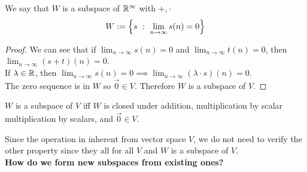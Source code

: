 We say that $W$ is a subspace of $\mathbb R^\infty$ with $+, \cdot$
\[ W := \left\{ s \ : \ \lim_{n \to \infty} s(n) = 0 \right\} \]
\begin{proof}
    We can see that if $\displaystyle \lim_{n \to \infty} s(n) = 0$ and $\displaystyle \lim_{n \to \infty} t(n) = 0$, then $\displaystyle \lim_{n \to \infty} (s + t)(n) = 0 $. \\
    If $\lambda \in \mathbb R$, then $\displaystyle \lim_{n \to \infty} s(n) = 0 \implies \lim_{n \to \infty} (\lambda \cdot s)(n) = 0$. \\ The zero sequence is in $W$ so $\vec 0 \in V$. Therefore $W$ is a subspace of $V$.
\end{proof}
\begin{theorem}
    $W$ is a subspace of $V$ iff $W$ is closed under addition, multiplication by scalar multiplication by scalars, and $\vec 0 \in V$.
\end{theorem}
Since the operation in inherent from vector space $V$, we do not need to verify the other property since they all for all $V$ and $W$ is a subspace of $V$. \\
\textbf{How do we form new subspaces from existing ones?}

